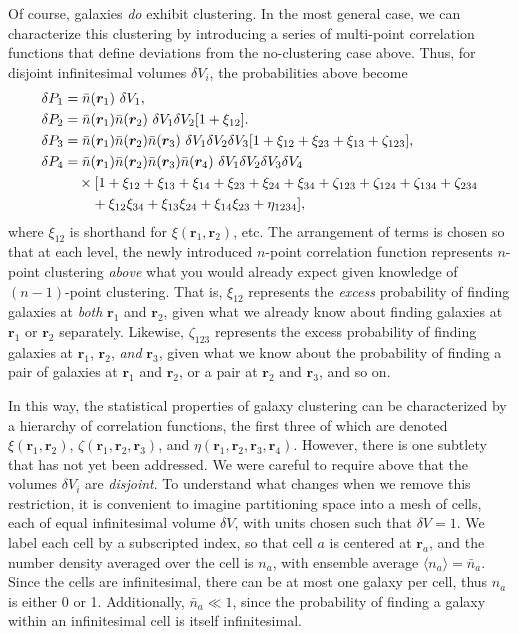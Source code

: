 \documentclass{article}
\newcommand{\nbar}{\bar{n}}
\renewcommand{\vec}[1]{\bm{#1}}
\renewcommand{\r}{\vec{r}}
\begin{document}
Of course, galaxies \emph{do} exhibit clustering.  In the most general case, we
can characterize this clustering by introducing a series of multi-point
correlation functions that define deviations from the no-clustering case above.
Thus, for disjoint infinitesimal volumes $\delta V_i$, the probabilities above
become
\begin{align}
    \delta P_1 &= \nbar(\r_1)~ \delta V_1, \\
    \delta P_2 &= \nbar(\r_1) \nbar(\r_2)~ \delta V_1 \delta V_2 [1 + \xi_{12}]. \\
    \delta P_3 &= \nbar(\r_1) \nbar(\r_2) \nbar(\r_3)~ \delta V_1 \delta V_2 \delta V_3[1 + \xi_{12} + \xi_{23} + \xi_{13} + \zeta_{123}], \\
    \delta P_4 &= \nbar(\r_1) \nbar(\r_2) \nbar(\r_3) \nbar(\r_4)~ \delta V_1 \delta V_2 \delta V_3 \delta V_4 \notag \\
        & \quad \times [1 + \xi_{12} + \xi_{13} + \xi_{14} + \xi_{23} + \xi_{24} + \xi_{34} + \zeta_{123} + \zeta_{124} + \zeta_{134} + \zeta_{234} \notag \\
        & \qquad + \xi_{12}\xi_{34} + \xi_{13}\xi_{24} + \xi_{14}\xi_{23} + \eta_{1234}],
\end{align}
where $\xi_{12}$ is shorthand for $\xi(\r_1,\r_2)$, etc.  The arrangement of
terms is chosen so that at each level, the newly introduced $n$-point
correlation function represents $n$-point clustering \emph{above} what you
would already expect given knowledge of $(n-1)$-point clustering.  That is,
$\xi_{12}$ represents the \emph{excess} probability of finding galaxies at
\emph{both} $\r_1$ and $\r_2$, given what we already know about finding
galaxies at $\r_1$ or $\r_2$ separately.  Likewise, $\zeta_{123}$ represents
the excess probability of finding galaxies at $\r_1$, $\r_2$, \emph{and}
$\r_3$, given what we know about the probability of finding a pair of galaxies
at $\r_1$ and $\r_2$, or a pair at $\r_2$ and $\r_3$, and so on.

In this way, the statistical properties of galaxy clustering can be
characterized by a hierarchy of correlation functions, the first three of which
are denoted $\xi(\r_1,\r_2)$, $\zeta(\r_1,\r_2,\r_3)$, and
$\eta(\r_1,\r_2,\r_3,\r_4)$.  However, there is one subtlety that has not yet
been addressed.  We were careful to require above that the volumes $\delta V_i$
are \emph{disjoint}.  To understand what changes when we remove this
restriction, it is convenient to imagine partitioning space into a mesh of
cells, each of equal infinitesimal volume $\delta V$, with units chosen such
that $\delta V = 1$.  We label each cell by a subscripted index, so that cell
$a$ is centered at $\r_a$, and the number density averaged over the cell is
$n_a$, with ensemble average $\langle n_a \rangle = \nbar_a$.  Since the cells
are infinitesimal, there can be at most one galaxy per cell, thus $n_a$ is
either 0 or 1.  Additionally, $\nbar_a \ll 1$, since the probability of finding
a galaxy within an infinitesimal cell is itself infinitesimal.
\end{document}
